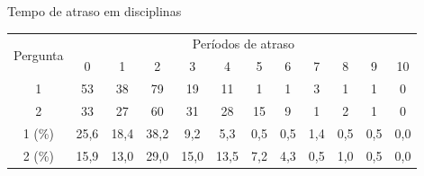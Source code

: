 \begin{apendicesenv}
  \begin{CenteredTable} \caption{Tempo de atraso em disciplinas} \label{table:5.0-Atrasos}
    \begin{tabular}{| c | c c c c c c c c c c c |}
      \hline
      \multicolumn{1}{|c|}{\multirow{2}{*}{Pergunta}} &
      \multicolumn{11}{c|}{Períodos de atraso}                                                                               \\
      \multicolumn{1}{|c|}{}                          &
      \multicolumn{1}{c|}{0}                          &
      \multicolumn{1}{c|}{1}                          &
      \multicolumn{1}{c|}{2}                          &
      \multicolumn{1}{c|}{3}                          &
      \multicolumn{1}{c|}{4}                          &
      \multicolumn{1}{c|}{5}                          &
      \multicolumn{1}{c|}{6}                          &
      \multicolumn{1}{c|}{7}                          &
      \multicolumn{1}{c|}{8}                          &
      \multicolumn{1}{c|}{9}                          &
      \multicolumn{1}{|c|}{10}
      \\
      \hline
      1                                               & 53   & 38   & 79   & 19   & 11   & 1   & 1   & 3   & 1   & 1   & 0   \\
      2                                               & 33   & 27   & 60   & 31   & 28   & 15  & 9   & 1   & 2   & 1   & 0   \\
      \hline
      1 (\%)                                          & 25,6 & 18,4 & 38,2 & 9,2  & 5,3  & 0,5 & 0,5 & 1,4 & 0,5 & 0,5 & 0,0 \\
      2 (\%)                                          & 15,9 & 13,0 & 29,0 & 15,0 & 13,5 & 7,2 & 4,3 & 0,5 & 1,0 & 0,5 & 0,0 \\
      \hline
    \end{tabular}
  \end{CenteredTable}

\end{apendicesenv}

